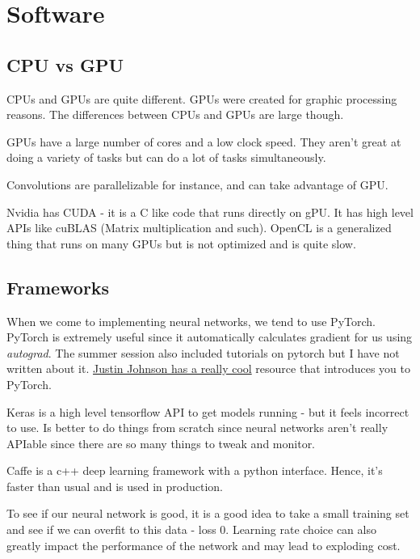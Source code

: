 \section{Software}

\subsection{CPU vs GPU}

CPUs and GPUs are quite different. GPUs were created for graphic processing reasons. The differences between CPUs and GPUs are large though.

GPUs have a large number of cores and a low clock speed. They aren't great at doing a variety of tasks but can do a lot of tasks simultaneously. 

Convolutions are parallelizable for instance, and can take advantage of GPU.

Nvidia has CUDA - it is a C like code that runs directly on gPU. It has high level APIs like cuBLAS (Matrix multiplication and such). OpenCL is a generalized thing that runs on many GPUs but is not optimized and is quite slow.

\subsection{Frameworks}

When we come to implementing neural networks, we tend to use PyTorch. PyTorch is extremely useful since it automatically calculates gradient for us using \textit{autograd}. The summer session also included tutorials on pytorch but I have not written about it. \href{https://github.com/jcjohnson/pytorch-examples}{Justin Johnson has a really cool} resource that introduces you to PyTorch.

Keras is a high level tensorflow API to get models running - but it feels incorrect to use. Is better to do things from scratch since neural networks aren't really APIable since there are so many things to tweak and monitor.  

Caffe is a c++ deep learning framework with a python interface. Hence, it's faster than usual and is used in production.

To see if our neural network is good, it is a good idea to take a small training set and see if we can overfit to this data - loss 0. Learning rate choice can also greatly impact the performance of the network and may lead to exploding cost. 

